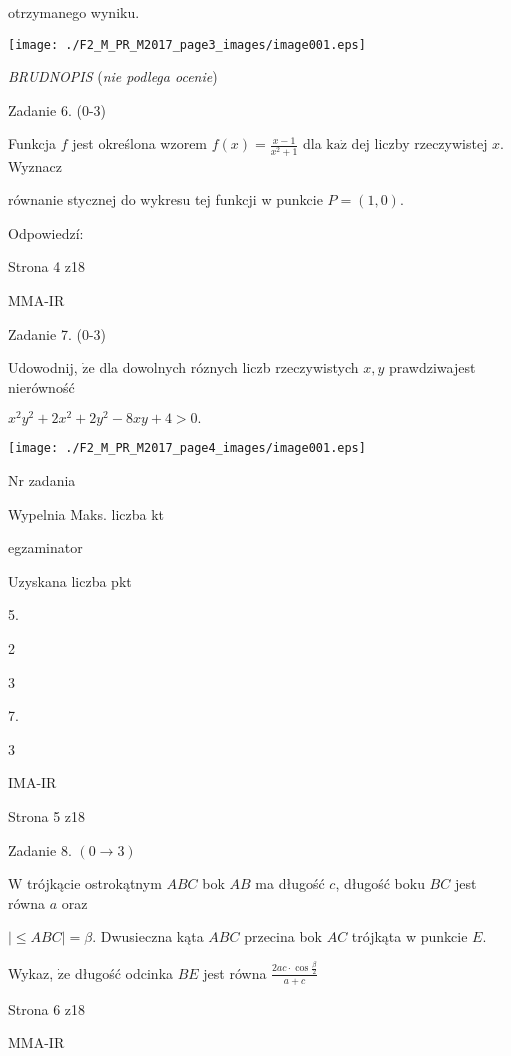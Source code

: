 \documentclass[a4paper,12pt]{article}
\begin{document}
otrzymanego wyniku.
\begin{center}
\texttt{[image: ./F2\_M\_PR\_M2017\_page3\_images/image001.eps]}
\end{center}
{\it BRUDNOPIS} ({\it nie podlega ocenie})

Zadanie 6. (0-3)

Funkcja $f$ jest określona wzorem $f(x)=\displaystyle \frac{x-1}{x^{2}+1}$ dla $\mathrm{k}\mathrm{a}\dot{\mathrm{z}}$ dej liczby rzeczywistej $x$. Wyznacz

równanie stycznej do wykresu tej funkcji w punkcie $P=(1,0).$

Odpowiedzí:

Strona 4 z18

MMA-IR





Zadanie 7. (0-3)

Udowodnij, $\dot{\mathrm{z}}\mathrm{e}$ dla dowolnych róznych liczb rzeczywistych $x,y$ prawdziwajest nierówność

$x^{2}y^{2}+2x^{2}+2y^{2}-8xy+4>0.$
\begin{center}
\texttt{[image: ./F2\_M\_PR\_M2017\_page4\_images/image001.eps]}
\end{center}
Nr zadania

Wypelnia Maks. liczba kt

egzaminator

Uzyskana liczba pkt

5.

2

3

7.

3

IMA-IR

Strona 5 z18





Zadanie 8. $(0\rightarrow 3)$

$\mathrm{W}$ trójkącie ostrokątnym $ABC$ bok $AB$ ma długość $c$, długość boku $BC$ jest równa $a$ oraz

$|\leq ABC|=\beta$. Dwusieczna kąta $ABC$ przecina bok $AC$ trójkąta w punkcie $E.$

Wykaz, $\dot{\mathrm{z}}\mathrm{e}$ długość odcinka $BE$ jest równa $\displaystyle \frac{2ac\cdot\cos\frac{\beta}{2}}{a+c}$

Strona 6 z18

MMA-IR
\end{document}
